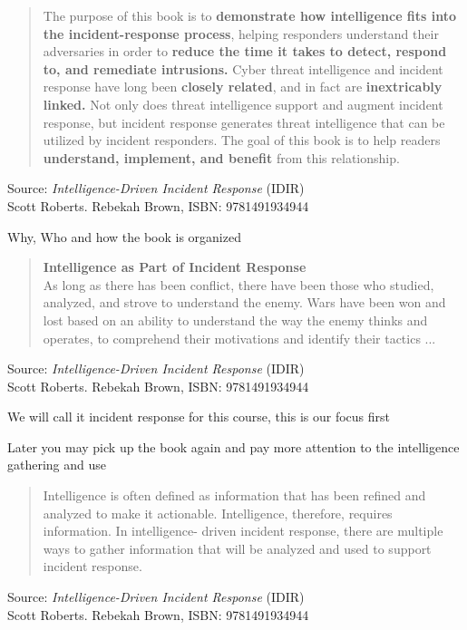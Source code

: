 \documentclass[Screen16to9,17pt]{foils}
\begin{document}
\begin{quote}
The purpose of this book is to {\bf demonstrate how intelligence fits into the incident-response process}, helping responders understand their adversaries in order to {\bf reduce the time it takes to detect, respond to, and remediate intrusions.} Cyber threat intelligence and incident response have long been {\bf closely related}, and in fact are {\bf inextricably linked.} Not only does threat intelligence support and augment incident response, but incident response generates threat intelligence that can be utilized by incident responders. The goal of this book is to help readers {\bf understand, implement, and benefit} from this relationship.
\end{quote}
Source: \emph{Intelligence-Driven Incident Response} (IDIR)\\
 Scott Roberts. Rebekah Brown, ISBN: 9781491934944

\begin{list2}
\item Why, Who and how the book is organized
\end{list2}



\begin{quote}
{\large\bf Intelligence as Part of Incident Response}\\
As long as there has been conflict, there have been those who studied, analyzed, and
strove to understand the enemy. Wars have been won and lost based on an ability to
understand the way the enemy thinks and operates, to comprehend their motivations
and identify their tactics ...
\end{quote}
Source: \emph{Intelligence-Driven Incident Response} (IDIR)\\
 Scott Roberts. Rebekah Brown, ISBN: 9781491934944

\begin{list2}
\item We will call it incident response for this course, this is our focus first
\item Later you may pick up the book again and pay more attention to the intelligence gathering and use
\end{list2}



\begin{quote}
Intelligence is often defined as information that has been refined and analyzed to
make it actionable. Intelligence, therefore, requires information. In intelligence-
driven incident response, there are multiple ways to gather information that will be
analyzed and used to support incident response.
\end{quote}
Source: \emph{Intelligence-Driven Incident Response} (IDIR)\\
 Scott Roberts. Rebekah Brown, ISBN: 9781491934944
\end{document}
